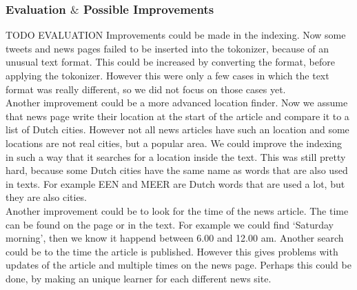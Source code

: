 \subsubsection*{Evaluation $\&$ Possible Improvements }
TODO EVALUATION
Improvements could be made in the indexing. Now some tweets and news pages failed to be inserted into the tokonizer, because of an unusual text format. 
This could be increased by converting the format, before applying the tokonizer. 
However this were only a few cases in which the text format was really different, so we did not focus on those cases yet. \\
Another improvement could be a more advanced location finder. 
Now we assume that news page write their location at the start of the article and compare it to a list of Dutch cities.
However not all news articles have such an location and some locations are not real cities, but a popular area. 
We could improve the indexing in such a way that it searches for a location inside the text. This was still pretty hard, because some Dutch cities have the same name as words that are also used in texts. For example EEN and MEER are Dutch words that are used a lot, but they are also cities. \\
Another improvement could be to look for the time of the news article. The time can be found on the page or in the text. 
For example we could find `Saturday morning', then we know it happend between 6.00 and 12.00 am. 
Another search could be to the time the article is published. 
However this gives problems with updates of the article and multiple times on the news page. 
Perhaps this could be done, by making an unique learner for each different news site. 